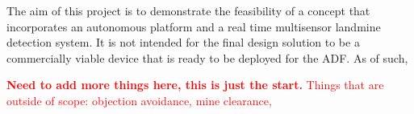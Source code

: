 \documentclass[main.tex]{subfiles}
\begin{document}
The aim of this project is to demonstrate the feasibility of a concept that incorporates an autonomous platform and a real time multisensor landmine detection system. It is not intended for the final design solution to be a commercially viable device that is ready to be deployed for the ADF. As of such, 

\textcolor{red}{\textbf{Need to add more things here, this is just the start.} Things that are outside of scope: objection avoidance, mine clearance, }
\end{document}
